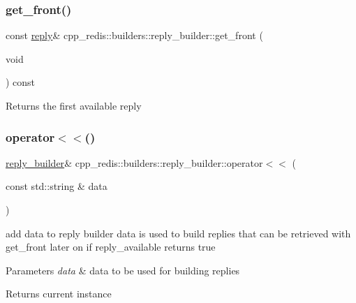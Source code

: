 \subsubsection{\texorpdfstring{get\+\_\+front()}{get\_front()}}
{\footnotesize\ttfamily const \mbox{\hyperlink{classcpp__redis_1_1reply}{reply}}\& cpp\+\_\+redis\+::builders\+::reply\+\_\+builder\+::get\+\_\+front (\begin{DoxyParamCaption}\item[{void}]{ }\end{DoxyParamCaption}) const}

\begin{DoxyReturn}{Returns}
the first available reply 
\end{DoxyReturn}
\mbox{\label{classcpp__redis_1_1builders_1_1reply__builder_a5f675e309a7a6002d582293c6410c967}} 
\subsubsection{\texorpdfstring{operator$<$$<$()}{operator<<()}}
{\footnotesize\ttfamily \mbox{\hyperlink{classcpp__redis_1_1builders_1_1reply__builder}{reply\+\_\+builder}}\& cpp\+\_\+redis\+::builders\+::reply\+\_\+builder\+::operator$<$$<$ (\begin{DoxyParamCaption}\item[{const std\+::string \&}]{data }\end{DoxyParamCaption})}

add data to reply builder data is used to build replies that can be retrieved with get\+\_\+front later on if reply\+\_\+available returns true


\begin{DoxyParams}{Parameters}
{\em data} & data to be used for building replies \\
\hline
\end{DoxyParams}
\begin{DoxyReturn}{Returns}
current instance 
\end{DoxyReturn}
\mbox{\label{classcpp__redis_1_1builders_1_1reply__builder_a71c0c93754b0bffb9c84c86ac3096bc4}} 

